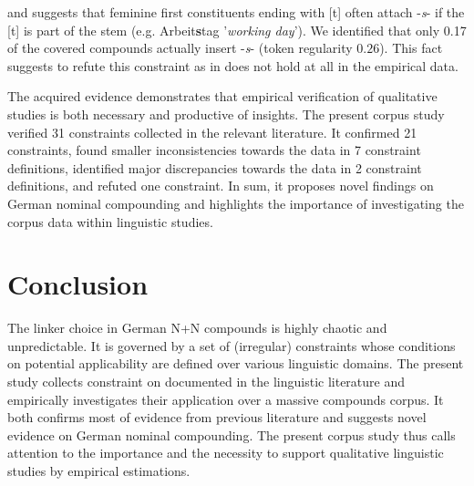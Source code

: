 \documentclass[10pt, a4paper]{article}
\newcommand{\zeroLinker}{\ensuremath{\boldsymbol{\varnothing}}}
\begin{document}
\citet[74, 75]{ortner_mueller-bollhagen_1991} and suggests that feminine first constituents ending with [t] often attach -\textit{s}- if the [t] is part of the stem (e.g. Arbeit\textbf{s}tag '\textit{working day}'). We identified that only 0.17 of the covered compounds actually insert -\textit{s}- (token regularity $0.26$). This fact suggests to refute this constraint as in does not hold at all in the empirical data.


The acquired evidence demonstrates that empirical verification of qualitative studies is both necessary and productive of insights. The present corpus study verified 31 constraints collected in the relevant literature. It confirmed 21 constraints, found smaller inconsistencies towards the data in 7 constraint definitions, identified major discrepancies towards the data in 2 constraint definitions, and refuted one constraint. In sum, it proposes novel findings on German nominal compounding and highlights the importance of investigating the corpus data within linguistic studies.




\section{Conclusion}
\label{sec:outro}

The linker choice in German N+N compounds is highly chaotic and unpredictable. It is governed by a set of (irregular) constraints whose conditions on potential applicability are defined over various linguistic domains. The present study collects constraint on documented in the linguistic literature and empirically investigates their application over a massive compounds corpus. It both confirms most of evidence from previous literature and suggests novel evidence on German nominal compounding. The present corpus study thus calls attention to the importance and the necessity to support qualitative linguistic studies by empirical estimations.

\end{document}
